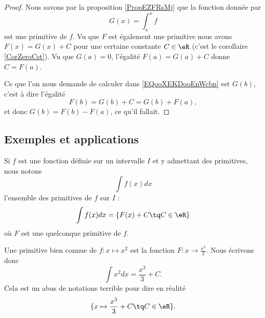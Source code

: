 \begin{proof}
    Nous savons par la proposition \ref{PropEZFRsMj} que la fonction donnée par
    \begin{equation}
        G(x)=\int_a^xf
    \end{equation}
    est une primitive de \( f\). Vu que \( F\) est également une primitive nous avons \( F(x)=G(x)+C\) pour une certaine constante \( C\in \eR\) (c'est le corollaire \ref{CorZeroCst}). Vu que \( G(a)=0\), l'égalité \( F(a)=G(a)+C\) donne \( C=F(a)\).

    Ce que l'on nous demande de calculer dans \eqref{EQooXEKDooEnWcbn} est \( G(b)\), c'est à dire l'égalité
    \begin{equation}
        F(b)=G(b)+C=G(b)+F(a),
    \end{equation}
    et donc \( G(b)=F(b)-F(a)\), ce qu'il fallait.
\end{proof}

\subsection{Exemples et applications}

Si \( f\) est une fonction définie sur un intervalle \( I\) et y admettant des primitives, nous notons
\begin{equation}
    \int f(x)dx
\end{equation}
l'ensemble des primitives de \( f\) sur \( I\) :
\begin{equation}
    \int f(x)dx=\left\{    F(x)+C\tq C\in \eR   \right\}
\end{equation}
où \( F\) est une quelconque primitive de \( f\).

\begin{example}
    Une primitive bien connue de \(  f\colon x\mapsto x^2 \) est la fonction \( F\colon x\to \frac{ x^3 }{ 3 }\). Nous écrivons donc
    \begin{equation}
        \int x^2dx=\frac{ x^3 }{ 3 }+C.
    \end{equation}
    Cela est un abus de notations terrible pour dire en réalité
    \begin{equation}
        \{ x\mapsto \frac{ x^3 }{ 3 }+C\tq C\in \eR \}.
    \end{equation}
\end{example}

